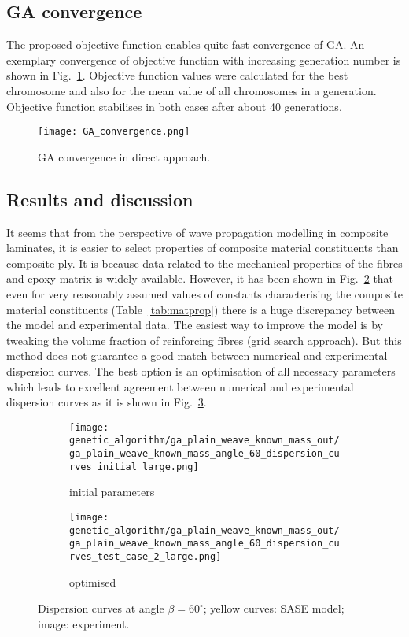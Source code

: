 \documentclass[preprint,12pt]{elsarticle}
\begin{document}
\subsection{GA convergence}
The proposed objective function enables quite fast convergence of GA. An exemplary 
convergence of 
objective function with increasing generation number is shown in 
Fig.~\ref{fig:GAconvergence}. Objective 
function values were calculated for the best chromosome and also for the mean value 
of all chromosomes 
in 
a generation. Objective function stabilises in both cases after about 40 generations.
	\begin{figure} [h!]
		\centering
		\texttt{[image: GA\_convergence.png]}
		\caption{GA convergence in direct approach.}
		\label{fig:GAconvergence}
	\end{figure}
	\subsection{Results and discussion}
It seems that from the perspective of wave propagation modelling in composite 
laminates, it is easier to 
select properties of composite material constituents than composite ply. It is because 
data related to the 
mechanical properties of the fibres and epoxy matrix is widely available. However, it 
has been shown in 
Fig.~\ref{fig:dispersion60deg_initial} that even for very reasonably assumed values of 
constants 
characterising the composite material constituents (Table~\ref{tab:matprop}) there is a 
huge discrepancy 
between the model and experimental data. The easiest way to improve the model is by 
tweaking the 
volume 
fraction of reinforcing fibres (grid search approach). But this method does not 
guarantee a good match 
between numerical and experimental dispersion curves. The best option is an 
optimisation of all necessary 
parameters which leads to excellent agreement between numerical and experimental 
dispersion curves as 
it 
is shown in Fig.~\ref{fig:dispersion60deg}.
	\begin{figure} [h!]
		\centering
		\begin{subfigure}[b]{\textwidth}
			\centering
\texttt{[image: genetic\_algorithm/ga\_plain\_weave\_known\_mass\_out/ga\_plain\_weave\_known\_mass\_angle\_60\_dispersion\_curves\_initial\_large.png]}
			\caption{initial parameters}
			\label{fig:dispersion60deg_initial}
		\end{subfigure}
		\begin{subfigure}[b]{\textwidth}
			\centering
\texttt{[image: genetic\_algorithm/ga\_plain\_weave\_known\_mass\_out/ga\_plain\_weave\_known\_mass\_angle\_60\_dispersion\_curves\_test\_case\_2\_large.png]}
			\caption{optimised}
			\label{fig:dispersion60deg}
		\end{subfigure}
	\caption{Dispersion curves at angle \(\beta = 60^{\circ}\); yellow curves: SASE 
	model; 
	image: experiment. }
	\label{fig:initial_optimized}
	\end{figure}
\end{document}

